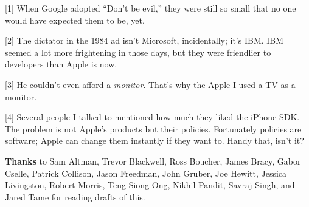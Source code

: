 {[}1{]} When Google adopted ``Don't be evil,'' they were still so small
that no one would have expected them to be, yet.

{[}2{]} The dictator in the 1984 ad isn't Microsoft, incidentally; it's
IBM. IBM seemed a lot more frightening in those days, but they were
friendlier to developers than Apple is now.

{[}3{]} He couldn't even afford a \emph{monitor}. That's why the Apple I
used a TV as a monitor.

{[}4{]} Several people I talked to mentioned how much they liked the
iPhone SDK. The problem is not Apple's products but their policies.
Fortunately policies are software; Apple can change them instantly if
they want to. Handy that, isn't it?

\textbf{Thanks} to Sam Altman, Trevor Blackwell, Ross Boucher, James
Bracy, Gabor Cselle, Patrick Collison, Jason Freedman, John Gruber, Joe
Hewitt, Jessica Livingston, Robert Morris, Teng Siong Ong, Nikhil
Pandit, Savraj Singh, and Jared Tame for reading drafts of this.
